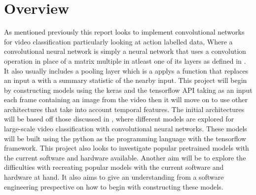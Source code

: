 \documentclass[10pt,phd,a4paper,oneside]{article}
\begin{document}


    \section{Overview}
    As mentioned previously this report looks to implement convolutional networks for video classification particularly looking at action labelled data, Where a convolutional neural network is simply a neural network that uses a convolution operation in place of a matrix multiple in atleast one of its layers as defined in \citep{Goodfellow-et-al-2016}. It also usually includes a pooling layer which is a applys a function that replaces an input a with a summary statistic of the nearby input.
    This project will begin by constructing models using the keras and the tensorflow API taking as an input each frame containing an image from the video then it will move on to use other architectures that take into account temporal features. The initial architectures will be based off those discussed in \citep{KarpathyCVPR14}, where different models are explored for large-scale video classification with convolutional neural networks. These models will be built using the python as the programming language  with the tensorflow framework. This project also looks to investigate popular pretrained models with the current software and hardware available.
    Another aim will be to explore the difficulties with recreating popular models with the current software and hardware at hand. It also aims to give an understanding from a software engineering prespective on how to begin with constructing these models.
\end{document}
